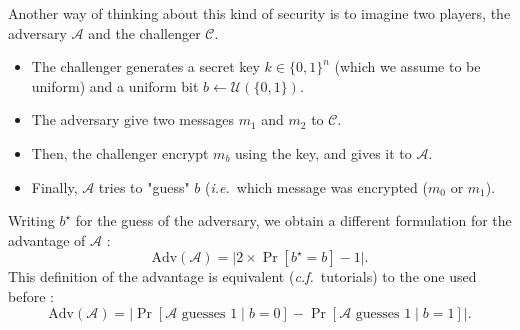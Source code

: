 \documentclass[./main]{subfiles}
\begin{document}
  \begin{rmk}
    Another way of thinking about this kind of security is to imagine two players, the adversary $\mathcal{A}$ and the challenger $\mathcal{C}$.
    \begin{itemize}
      \item The challenger generates a secret key $k \in \{0,1\}^n$ (which we assume to be uniform) and a uniform bit $b \gets \mathcal{U}(\{0,1\})$.
      \item The adversary give two messages $m_1$ and $m_2$ to $\mathcal{C}$.
      \item Then, the challenger encrypt $m_b$ using the key, and gives it to  $\mathcal{A}$.
      \item Finally, $\mathcal{A}$ tries to "guess" $b$ (\textit{i.e.}\ which message was encrypted ($m_0$ or $m_1$).
    \end{itemize}
    Writing $b^\star$ for the guess of the adversary, we obtain a different formulation for the advantage of $\mathcal{A}$ :
    \[
    \mathrm{Adv}(\mathcal{A}) = \big| 2 \times \Pr[b^\star = b] - 1 \big|
    .\]
    This definition of the advantage is equivalent (\textit{c.f.}\ tutorials) to the one used before :
    \[
      \mathrm{Adv}(\mathcal{A}) = \big|{\Pr[\mathcal{A} \text{ guesses } 1  \mid b = 0]} - \Pr[\mathcal{A} \text{ guesses } 1  \mid b = 1]\big|
    .\] 
  \end{rmk}
\end{document}

